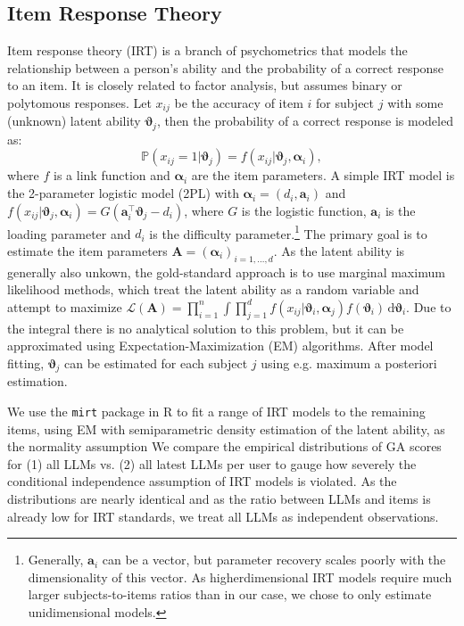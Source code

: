 \documentclass{article}
\begin{document}
\subsection{Item Response Theory}
Item response theory (IRT) is a branch of psychometrics that models the relationship between a person's ability and the probability of a correct response to an item. It is closely related to factor analysis, but assumes binary or polytomous responses. %
Let $x_{ij}$ be the accuracy of item $i$ for subject $j$ with some (unknown) latent ability $\boldsymbol \vartheta_j$, then the probability of a correct response is modeled as:
\begin{equation}
   \mathbb P(x_{ij}=1|\boldsymbol \vartheta_j) = f(x_{ij}|\boldsymbol \vartheta_j, \boldsymbol \alpha_i),
\end{equation}
where $f$ is a link function and $\boldsymbol \alpha_i$ are the item parameters. A simple IRT model is the 2-parameter logistic model (2PL) with $\boldsymbol \alpha_i = (d_i, \mathbf a_i)$ and $f(x_{ij}|\boldsymbol \vartheta_j, \boldsymbol \alpha_i) = G(\mathbf a_i^\top  \boldsymbol \vartheta_j - d_i)$, where $G$ is the logistic function, $\mathbf a_i$ is the loading parameter and $d_i$ is the difficulty parameter.\footnote{Generally, $\mathbf a_i$ can be a vector, but parameter recovery scales poorly with the dimensionality of this vector. As higherdimensional IRT models require much larger subjects-to-items ratios than in our case, we chose to only estimate unidimensional models.} The primary goal is to estimate the item parameters $\mathbf A = (\boldsymbol \alpha_i)_{i = 1, \ldots, d}$. As the latent ability is generally also unkown, the gold-standard approach is to use marginal maximum likelihood methods, which treat the latent ability as a random variable and attempt to maximize $\mathcal L(\mathbf A) = \prod_{i=1}^n \int \prod_{j=1}^d f(x_{ij}|\boldsymbol \vartheta_i, \boldsymbol\alpha_j) f(\boldsymbol \vartheta_i) \, \mathrm d\boldsymbol \vartheta_i$. Due to the integral there is no analytical solution to this problem, but it can be approximated using Expectation-Maximization (EM) algorithms. %
After model fitting, $\boldsymbol \vartheta_j$ can be estimated for each subject $j$ using e.g. maximum a posteriori estimation. %

We use the \texttt{mirt} package in R to fit a range of IRT models to the remaining items, using EM with semiparametric density estimation of the latent ability, as the normality assumption We compare the empirical distributions of GA scores for (1) all LLMs vs. (2) all latest LLMs per user to gauge how severely the conditional independence assumption of IRT models is violated. As the distributions are nearly identical and as the ratio between LLMs and items is already low for IRT standards, we treat all LLMs as independent observations.
\end{document}

